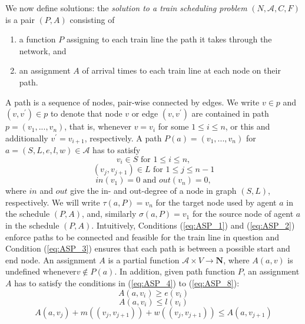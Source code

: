 \documentclass{article}
\begin{document}
We now define solutions: the \emph{solution to a train scheduling problem} $(N, \mathcal{A}, C, F)$ is a pair $(P,A)$ consisting of
\begin{enumerate}
    \item a function $P$ assigning to each train line the path it takes through the network, and
    \item an assignment $A$ of arrival times to each train line at each node on their path.
\end{enumerate}
A path is a sequence of nodes, pair-wise connected by edges. We write $v\in p$ and $(v, v^\prime)\in p$ to denote that node $v$ or edge $(v, v^\prime)$ are contained in path $p=(v_1, . . . , v_n)$, that is, whenever $v=v_i$ for some $1\leq i \leq n$, or this and additionally $v^\prime=v_{i+1}$, respectively.
%
A path $P(a) = (v_1, . . . , v_n)$ for $a= (S, L, e, l, w)\in \mathcal{A}$ has to satisfy
\begin{equation}
v_i \in S \textrm{ for }1\leq i \leq n \label{eq:ASP_1},
\end{equation}
\begin{equation}
(v_j, v_{j+1})\in L \textrm{ for } 1\leq j \leq n-1 \label{eq:ASP_2}
\end{equation}
\begin{equation}
in(v_1) = 0 \textrm{ and } out(v_n) = 0,\label{eq:ASP_3}
\end{equation}
where $in$ and $out$ give the in- and out-degree of a node in graph $(S, L)$, respectively.
We will write $\tau(a,P)=v_n$ for the target node used by agent $a$ in the schedule $(P,A)$, and, similarly $\sigma(a,P)=v_1$ for the source node of agent $a$ in the schedule $(P,A)$.
Intuitively, Conditions (\ref{eq:ASP_1}) and (\ref{eq:ASP_2}) enforce paths to be connected and feasible for the train line in question and Condition (\ref{eq:ASP_3}) ensures that each path is between a possible start and end node.
An assignment $A$ is a partial function $\mathcal{A}\times V\to \mathbf{N}$, where $A(a, v)$ is undefined whenever$v\not\in P(a)$. In addition, given path function $P$, an assignment $A$ has to satisfy the conditions in (\ref{eq:ASP_4}) to (\ref{eq:ASP_8}):
\begin{equation}
A(a, v_i)\geq e(v_i)\label{eq:ASP_4}
\end{equation}
\begin{equation}
A(a, v_i)\leq l(v_i)\label{eq:ASP_5}
\end{equation}
\begin{equation}
A(a, v_j) +m((v_j, v_{j+1})) +w((v_j, v_{j+1}))\leq A(a, v_{j+1})\label{eq:ASP_6}
\end{equation}
\end{document}
